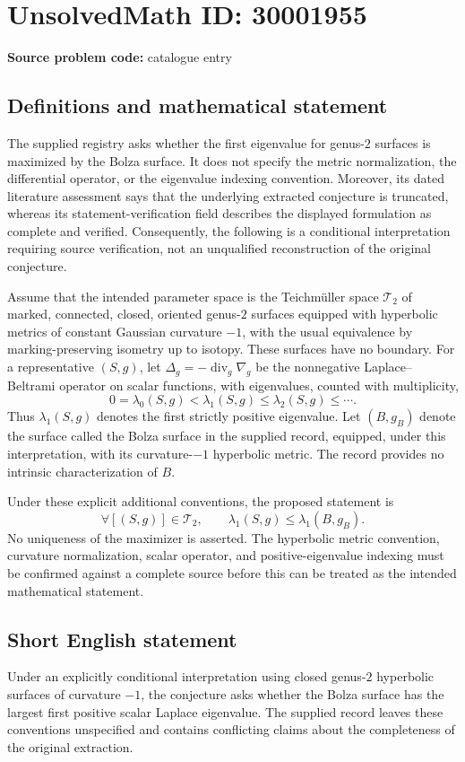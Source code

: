 \documentclass[11pt]{article}
\begin{document}
\section*{UnsolvedMath ID: 30001955}
\textbf{Source problem code:} catalogue entry
\subsection{Definitions and mathematical statement}
The supplied registry asks whether the first eigenvalue for genus-$2$ surfaces is maximized by the Bolza surface. It does not specify the metric normalization, the differential operator, or the eigenvalue indexing convention. Moreover, its dated literature assessment says that the underlying extracted conjecture is truncated, whereas its statement-verification field describes the displayed formulation as complete and verified. Consequently, the following is a conditional interpretation requiring source verification, not an unqualified reconstruction of the original conjecture.

Assume that the intended parameter space is the Teichm\"uller space $\mathcal T_2$ of marked, connected, closed, oriented genus-$2$ surfaces equipped with hyperbolic metrics of constant Gaussian curvature $-1$, with the usual equivalence by marking-preserving isometry up to isotopy. These surfaces have no boundary. For a representative $(S,g)$, let $\Delta_g=-\operatorname{div}_g\nabla_g$ be the nonnegative Laplace--Beltrami operator on scalar functions, with eigenvalues, counted with multiplicity,
\[
0=\lambda_0(S,g)<\lambda_1(S,g)\leq\lambda_2(S,g)\leq\cdots.
\]
Thus $\lambda_1(S,g)$ denotes the first strictly positive eigenvalue. Let $(B,g_B)$ denote the surface called the Bolza surface in the supplied record, equipped, under this interpretation, with its curvature-$-1$ hyperbolic metric. The record provides no intrinsic characterization of $B$.

Under these explicit additional conventions, the proposed statement is
\[
\forall [(S,g)]\in\mathcal T_2,\qquad
\lambda_1(S,g)\leq\lambda_1(B,g_B).
\]
No uniqueness of the maximizer is asserted. The hyperbolic metric convention, curvature normalization, scalar operator, and positive-eigenvalue indexing must be confirmed against a complete source before this can be treated as the intended mathematical statement.
\subsection{Short English statement}
Under an explicitly conditional interpretation using closed genus-$2$ hyperbolic surfaces of curvature $-1$, the conjecture asks whether the Bolza surface has the largest first positive scalar Laplace eigenvalue. The supplied record leaves these conventions unspecified and contains conflicting claims about the completeness of the original extraction.
\end{document}
